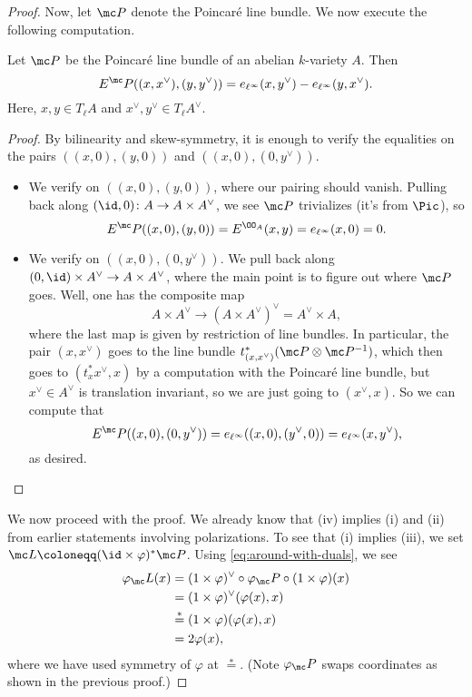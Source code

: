 \documentclass[../notes.tex]{subfiles}
\begin{document}
\begin{proof}
	Now, let $\mc P$ denote the Poincar\'e line bundle. We now execute the following computation.
	\begin{lemma}
		Let $\mc P$ be the Poincar\'e line bundle of an abelian $k$-variety $A$. Then
		\[E^\mc P((x,x^\lor),(y,y^\lor))=e_{\ell^\infty}(x,y^\lor)-e_{\ell^\infty}(y,x^\lor).\]
		Here, $x,y\in T_\ell A$ and $x^\lor,y^\lor\in T_\ell A^\lor$.
	\end{lemma}
	\begin{proof}
		By bilinearity and skew-symmetry, it is enough to verify the equalities on the pairs $((x,0),(y,0))$ and $((x,0),(0,y^\lor))$.
		\begin{itemize}
			\item We verify on $((x,0),(y,0))$, where our pairing should vanish. Pulling back along $({\id},0)\colon A\to A\times A^\lor$, we see $\mc P$ trivializes (it's from $\Pic$), so
			\[E^\mc P((x,0),(y,0))=E^{\OO_A}(x,y)=e_{\ell^\infty}(x,0)=0.\]
			\item We verify on $((x,0),(0,y^\lor))$. We pull back along $(0,{\id})\times A^\lor\to A\times A^\lor$, where the main point is to figure out where $\mc P$ goes. Well, one has the composite map
			\[A\times A^\lor\to(A\times A^\lor)^\lor=A^\lor\times A,\]
			where the last map is given by restriction of line bundles. In particular, the pair $(x,x^\lor)$ goes to the line bundle $t_{(x,x^\lor)}^*(\mc P\otimes\mc P^{-1})$, which then goes to $(t_x^*x^\lor,x)$ by a computation with the Poincar\'e line bundle, but $x^\lor\in A^\lor$ is translation invariant, so we are just going to $(x^\lor,x)$. So we can compute that
			\[E^\mc P((x,0),(0,y^\lor))=e_{\ell^\infty}((x,0),(y^\lor,0))=e_{\ell^\infty}(x,y^\lor),\]
			as desired.
			\qedhere
		\end{itemize}
	\end{proof}
	We now proceed with the proof. We already know that (iv) implies (i) and (ii) from earlier statements involving polarizations. To see that (i) implies (iii), we set $\mc L\coloneqq({\id}\times\varphi)^*\mc P$. Using \eqref{eq:around-with-duals}, we see
	\begin{align*}
		\varphi_\mc L(x) &= (1\times\varphi)^\lor\circ\varphi_\mc P\circ(1\times\varphi)(x) \\
		&= (1\times\varphi)^\lor(\varphi(x),x) \\
		&\stackrel*= (1\times\varphi)(\varphi(x),x) \\
		&= 2\varphi(x),
	\end{align*}
	where we have used symmetry of $\varphi$ at $\stackrel*=$. (Note $\varphi_\mc P$ swaps coordinates as shown in the previous proof.)


\end{proof}
\end{document}
